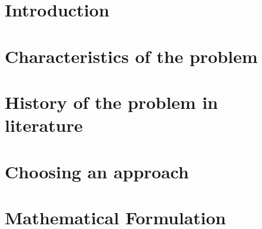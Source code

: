 \documentclass[
    fontsize=10pt,    %
    a4paper,      %
    parskip=half-,    %
    twoside,      %
    headings=big,  %
    appendixprefix=true,
    ]{scrreprt}    %
\begin{document}
\clearpage

\clearpage


\cleardoublepage
\pagestyle{fancy}



\chapter{Introduction}\label{chapter:einleitung}



%

\chapter{Characteristics of the problem}\label{chapter:xxxname1xxx}
%


\chapter{History of the problem in literature}\label{chapter:xxxname1_2xxx}


\chapter{Choosing an approach}\label{chapter:xxxname2xxx}
%


\chapter{Mathematical Formulation}\label{chapter:mathform}

\end{document}
